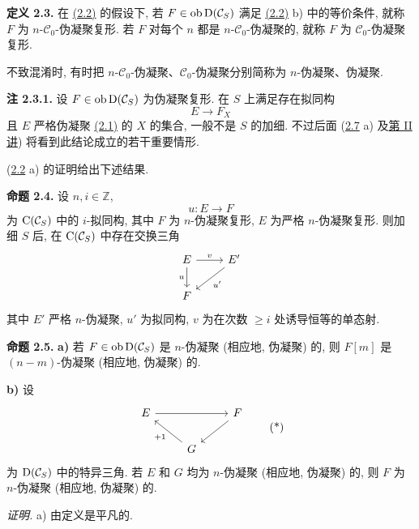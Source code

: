 \textbf{定义 2.3.} 在 \hyperlink{sga6.e01.prop.2-2}{(2.2)} 的假设下, 若 \(F\in\operatorname{ob}\mathrm D(\mathcal C_S)\) 满足 \hyperlink{sga6.e01.prop.2-2}{(2.2)} b) 中的等价条件, 就称 \(F\) 为 \(n\)-\(\mathcal C_0\)-伪凝聚复形. 若 \(F\) 对每个 \(n\) 都是 \(n\)-\(\mathcal C_0\)-伪凝聚的, 就称 \(F\) 为 \(\mathcal C_0\)-伪凝聚复形.

不致混淆时, 有时把 \(n\)-\(\mathcal C_0\)-伪凝聚、\(\mathcal C_0\)-伪凝聚分别简称为 \(n\)-伪凝聚、伪凝聚.

\textbf{注 2.3.1.} 设 \(F\in\operatorname{ob}\mathrm D(\mathcal C_S)\) 为伪凝聚复形. 在 \(S\) 上满足存在拟同构
\[
  E\longrightarrow F_X
\]
且 \(E\) 严格伪凝聚 \hyperlink{sga6.e01.def.2-1}{(2.1)} 的 \(X\) 的集合, 一般不是 \(S\) 的加细. 不过后面 (\hyperlink{sga6.e01.prop.2-7}{2.7} a) 及\hyperlink{sga6.e02.expose}{第 II 讲}) 将看到此结论成立的若干重要情形.

(\hyperlink{sga6.e01.prop.2-2}{2.2} a) 的证明给出下述结果.

\textbf{命题 2.4.} 设 \(n,i\in\mathbb Z\),
\[
  u:E\longrightarrow F
\]
为 \(\mathrm C(\mathcal C_S)\) 中的 \(i\)-拟同构, 其中 \(F\) 为 \(n\)-伪凝聚复形, \(E\) 为严格 \(n\)-伪凝聚复形. 则加细 \(S\) 后, 在 \(\mathrm C(\mathcal C_S)\) 中存在交换三角
\[
\begin{tikzcd}
E \arrow[r,"v"] \arrow[d,"u"'] & E' \arrow[dl,"u'"]\\
F &
\end{tikzcd}
\]
其中 \(E'\) 严格 \(n\)-伪凝聚, \(u'\) 为拟同构, \(v\) 为在次数 \(\geq i\) 处诱导恒等的单态射.

\textbf{命题 2.5.} \textbf{a)} 若 \(F\in\operatorname{ob}\mathrm D(\mathcal C_S)\) 是 \(n\)-伪凝聚 (相应地, 伪凝聚) 的, 则 \(F[m]\) 是 \((n-m)\)-伪凝聚 (相应地, 伪凝聚) 的.

\textbf{b)} 设
\[
\begin{tikzcd}
E \arrow[rr] && F \arrow[dl]\\
& G \arrow[ul,"+1"] &
\end{tikzcd}
\tag{*}
\]
为 \(\mathrm D(\mathcal C_S)\) 中的特异三角. 若 \(E\) 和 \(G\) 均为 \(n\)-伪凝聚 (相应地, 伪凝聚) 的, 则 \(F\) 为 \(n\)-伪凝聚 (相应地, 伪凝聚) 的.

\emph{证明.} a) 由定义是平凡的.

